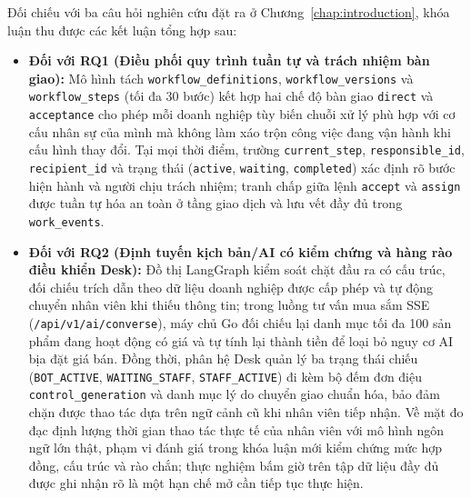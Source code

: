 \begin{enumerate}
\end{enumerate}

Đối chiếu với ba câu hỏi nghiên cứu đặt ra ở Chương~\ref{chap:introduction}, khóa luận thu được các kết luận tổng hợp sau:

\begin{itemize}
  \item \textbf{Đối với RQ1 (Điều phối quy trình tuần tự và trách nhiệm bàn giao):} Mô hình tách \texttt{workflow\_\hspace{0pt}definitions}, \texttt{workflow\_\hspace{0pt}versions} và \texttt{workflow\_\hspace{0pt}steps} (tối đa 30 bước) kết hợp hai chế độ bàn giao \texttt{direct} và \texttt{acceptance} cho phép mỗi doanh nghiệp tùy biến chuỗi xử lý phù hợp với cơ cấu nhân sự của mình mà không làm xáo trộn công việc đang vận hành khi cấu hình thay đổi. Tại mọi thời điểm, trường \texttt{current\_\hspace{0pt}step}, \texttt{responsible\_\hspace{0pt}id}, \texttt{recipient\_\hspace{0pt}id} và trạng thái (\texttt{active}, \texttt{waiting}, \texttt{completed}) xác định rõ bước hiện hành và người chịu trách nhiệm; tranh chấp giữa lệnh \texttt{accept} và \texttt{assign} được tuần tự hóa an toàn ở tầng giao dịch và lưu vết đầy đủ trong \texttt{work\_\hspace{0pt}events}.
  \item \textbf{Đối với RQ2 (Định tuyến kịch bản/AI có kiểm chứng và hàng rào điều khiển Desk):} Đồ thị LangGraph kiểm soát chặt đầu ra có cấu trúc, đối chiếu trích dẫn theo dữ liệu doanh nghiệp được cấp phép và tự động chuyển nhân viên khi thiếu thông tin; trong luồng tư vấn mua sắm SSE (\texttt{/api/\hspace{0pt}v1/\hspace{0pt}ai/\hspace{0pt}converse}), máy chủ Go đối chiếu lại danh mục tối đa 100 sản phẩm đang hoạt động có giá và tự tính lại thành tiền để loại bỏ nguy cơ AI bịa đặt giá bán. Đồng thời, phân hệ Desk quản lý ba trạng thái chiếu (\texttt{BOT\_\hspace{0pt}ACTIVE}, \texttt{WAITING\_\hspace{0pt}STAFF}, \texttt{STAFF\_\hspace{0pt}ACTIVE}) đi kèm bộ đếm đơn điệu \texttt{control\_\hspace{0pt}generation} và danh mục lý do chuyển giao chuẩn hóa, bảo đảm chặn được thao tác dựa trên ngữ cảnh cũ khi nhân viên tiếp nhận. Về mặt đo đạc định lượng thời gian thao tác thực tế của nhân viên với mô hình ngôn ngữ lớn thật, phạm vi đánh giá trong khóa luận mới kiểm chứng mức hợp đồng, cấu trúc và rào chắn; thực nghiệm bấm giờ trên tập dữ liệu đầy đủ được ghi nhận rõ là một hạn chế mở cần tiếp tục thực hiện.

\end{itemize}
